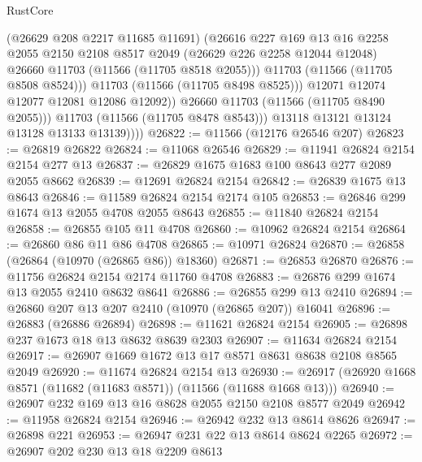 \begin{lexlean}{RustCore}
\begin{coremodule}
                        (@26629 @208 @2217 @11685 @11691)
                        (@26616
                          @227
                          @169
                          @13
                          @16
                          @2258
                          @2055
                          @2150
                          @2108
                          @8517
                          @2049
                          (@26629 @226 @2258 @12044 @12048)
                          @26660
                          @11703
                          (@11566 (@11705 @8518 @2055)))
                        @11703
                        (@11566 (@11705 @8508 @8524)))
                      @11703
                      (@11566 (@11705 @8498 @8525)))
                    @12071
                    @12074
                    @12077
                    @12081
                    @12086
                    @12092))
                @26660
                @11703
                (@11566 (@11705 @8490 @2055)))
              @11703
              (@11566 (@11705 @8478 @8543)))
            @13118
            @13121
            @13124
            @13128
            @13133
            @13139))))
@26822 := @11566 (@12176 @26546 @207)
@26823 := @26819 @26822
@26824 := @11068 @26546
@26829 := @11941 @26824 @2154 @2154 @277 @13
@26837 := @26829 @1675 @1683 @100 @8643 @277 @2089 @2055 @8662
@26839 := @12691 @26824 @2154
@26842 := @26839 @1675 @13 @8643
@26846 := @11589 @26824 @2154 @2174 @105
@26853 := @26846 @299 @1674 @13 @2055 @4708 @2055 @8643
@26855 := @11840 @26824 @2154
@26858 := @26855 @105 @11 @4708
@26860 := @10962 @26824 @2154
@26864 := @26860 @86 @11 @86 @4708
@26865 := @10971 @26824
@26870 := @26858 (@26864 (@10970 (@26865 @86)) @18360)
@26871 := @26853 @26870
@26876 := @11756 @26824 @2154 @2174 @11760 @4708
@26883 := @26876 @299 @1674 @13 @2055 @2410 @8632 @8641
@26886 := @26855 @299 @13 @2410
@26894 := @26860 @207 @13 @207 @2410 (@10970 (@26865 @207)) @16041
@26896 := @26883 (@26886 @26894)
@26898 := @11621 @26824 @2154
@26905 := @26898 @237 @1673 @18 @13 @8632 @8639 @2303
@26907 := @11634 @26824 @2154
@26917 := @26907 @1669 @1672 @13 @17 @8571 @8631 @8638 @2108 @8565 @2049
@26920 := @11674 @26824 @2154 @13
@26930 := @26917 (@26920 @1668 @8571 (@11682 (@11683 @8571)) (@11566 (@11688 @1668 @13)))
@26940 := @26907 @232 @169 @13 @16 @8628 @2055 @2150 @2108 @8577 @2049
@26942 := @11958 @26824 @2154
@26946 := @26942 @232 @13 @8614 @8626
@26947 := @26898 @221
@26953 := @26947 @231 @22 @13 @8614 @8624 @2265
@26972 := @26907
    @202
    @230
    @13
    @18
    @2209
    @8613

\end{coremodule}
\end{lexlean}
